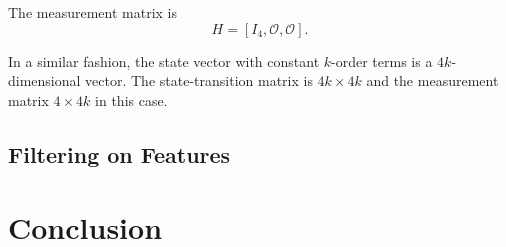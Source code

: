 \documentclass[conference]{IEEEtran}
\begin{document}
The measurement matrix is
\[
    H = [I_4, \mathcal{O}, \mathcal{O}].
\]

In a similar fashion, the state vector with constant $k$-order terms is a $4k$-dimensional vector. The state-transition matrix is $4k \times 4k$ and the measurement matrix $4 \times 4k$ in this case.

\subsection{Filtering on Features}

\section{Conclusion}



\end{document}
